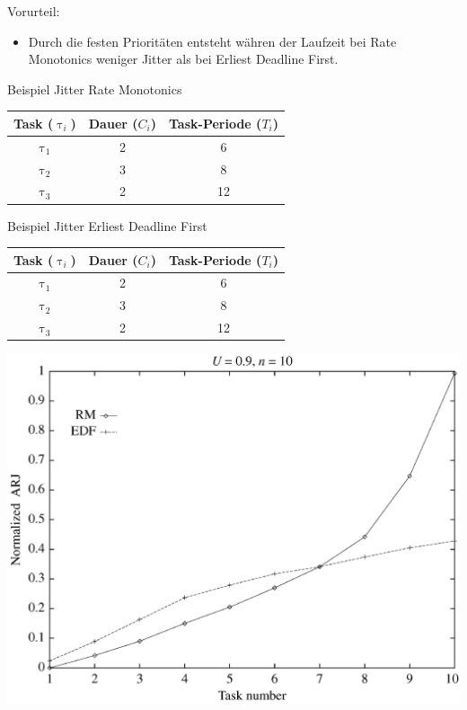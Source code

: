 \begin{frame}{\subsecname}
	Vorurteil:
	\begin{itemize}
		\item Durch die festen Prioritäten entsteht währen der Laufzeit bei Rate Monotonics weniger Jitter als bei Erliest Deadline First. 
	\end{itemize}
\end{frame}

\newcommand{\showRMSlideJit}[1] {\begin{frame}{Beispiel Jitter Rate Monotonics}
		\begin{center}
		\begin{tabular}{c||c|c}
			Task ($\uptau_i$) & Dauer ($C_i$) & Task-Periode ($T_i$)\\\hline\hline
			$\uptau_1$ & 2 & 6\\
			$\uptau_2$ & 3 & 8\\
			$\uptau_3$ & 2 & 12
		\end{tabular}
	\end{center}
	
\end{frame}}

%
{%
	\showRMSlideJit{\arabic{ct}}
}

\begin{frame}{Beispiel Jitter Erliest Deadline First}
		\begin{center}
		\begin{tabular}{c||c|c}
			Task ($\uptau_i$) & Dauer ($C_i$) & Task-Periode ($T_i$)\\\hline\hline
			$\uptau_1$ & 2 & 6\\
			$\uptau_2$ & 3 & 8\\
			$\uptau_3$ & 2 & 12
		\end{tabular}
	\end{center}
	
\end{frame}

\begin{frame}{\subsecname}
	\begin{center}
		\includegraphics[scale=.25]{graphics/vergleich/jitter.png}	
	\end{center}
\end{frame}

